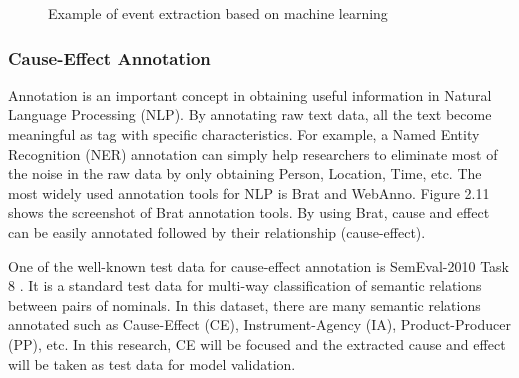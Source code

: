 \documentclass[twoside]{utmthesis}
\begin{document}
\begin{figure}[H]
	\centering
	\caption{Example of event extraction based on machine learning}
	\label{fig:extractionmachinelearning}
\end{figure}
\vspace{-1.5cm}


\subsubsection{Cause-Effect Annotation}
Annotation is an important concept in obtaining useful information in Natural Language Processing (NLP). By annotating raw text data, all the text become meaningful as tag with specific characteristics. For example, a Named Entity Recognition (NER) annotation can simply help researchers to eliminate most of the noise in the raw data by only obtaining Person, Location, Time, etc. The most widely used annotation tools for NLP is Brat and WebAnno. Figure 2.11 shows the screenshot of Brat annotation tools. By using Brat, cause and effect can be easily annotated followed by their relationship (cause-effect). 

One of the well-known test data for cause-effect annotation is SemEval-2010 Task 8 \cite{hendrickx-etal-2010-semeval}. It is a standard test data for multi-way classification of semantic relations between pairs of nominals. In this dataset, there are many semantic relations annotated such as Cause-Effect (CE), Instrument-Agency (IA), Product-Producer (PP), etc. In this research, CE will be focused and the extracted cause and effect will be taken as test data for model validation. 
\end{document}
